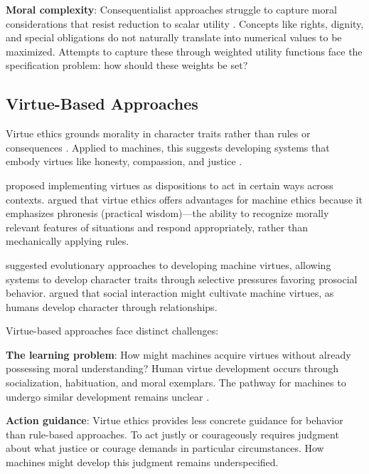 \documentclass[12pt]{article}
\begin{document}
\textbf{Moral complexity}: Consequentialist approaches struggle to capture moral considerations that resist reduction to scalar utility \citep{anderson2011machine}. Concepts like rights, dignity, and special obligations do not naturally translate into numerical values to be maximized. Attempts to capture these through weighted utility functions face the specification problem: how should these weights be set?

\subsection{Virtue-Based Approaches}

Virtue ethics grounds morality in character traits rather than rules or consequences \citep{aristotle350bce, macintyre1981after}. Applied to machines, this suggests developing systems that embody virtues like honesty, compassion, and justice \citep{howard2001computational, vallor2016technology}.

\citet{howard2001computational} proposed implementing virtues as dispositions to act in certain ways across contexts. \citet{vallor2016technology} argued that virtue ethics offers advantages for machine ethics because it emphasizes phronesis (practical wisdom)—the ability to recognize morally relevant features of situations and respond appropriately, rather than mechanically applying rules.

\citet{berberich2015evolutionary} suggested evolutionary approaches to developing machine virtues, allowing systems to develop character traits through selective pressures favoring prosocial behavior. \citet{coeckelbergh2010moral} argued that social interaction might cultivate machine virtues, as humans develop character through relationships.

Virtue-based approaches face distinct challenges:

\textbf{The learning problem}: How might machines acquire virtues without already possessing moral understanding? Human virtue development occurs through socialization, habituation, and moral exemplars. The pathway for machines to undergo similar development remains unclear \citep{wallach2008moral}.

\textbf{Action guidance}: Virtue ethics provides less concrete guidance for behavior than rule-based approaches. To act justly or courageously requires judgment about what justice or courage demands in particular circumstances. How machines might develop this judgment remains underspecified.
\end{document}
